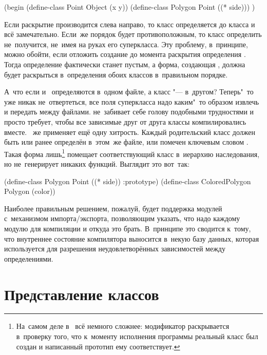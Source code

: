 \begin{code:lisp}
(begin (define-class Point Object (x y))
       (define-class Polygon Point ((* side))) )
\end{code:lisp}

Если раскрытие производится слева направо, то класс  определяется до
класса  и всё замечательно. Если~же порядок будет противоположным,
то класс  определить не~получится, не~имея на руках его суперкласса.
Эту проблему, в~принципе, можно обойти, если отложить создание  до
момента раскрытия определения . Тогда определение 
фактически станет пустым, а форма, создающая , должна будет раскрыться
в~определения обоих классов в~правильном порядке.

А~что если  и~ определяются в~одном файле, а класс
 "--- в~другом? Теперь"~то уже никак не~отвертеться, все
поля суперкласса надо каким"~то образом извлечь и передать между файлами.
{\Meroonet} не~забивает себе голову подобными трудностями и просто требует,
чтобы все зависимые друг от друга классы компилировались вместе. {\Meroon}~же
применяет ещё одну хитрость. Каждый родительский класс должен быть или ранее
определён в~этом~же файле, или помечен ключевым словом . Такая
форма лишь\footnote{На~самом деле в~{\Meroon} всё немного сложнее: модификатор
 раскрывается в~проверку того, что к~моменту исполнения программы
реальный класс был создан и написанный прототип ему соответствует.} помещает
соответствующий класс в~иерархию наследования, но не~генерирует никаких функций.
Выглядит это вот~так:

\begin{code:lisp}
(define-class Polygon Point ((* side)) :prototype)
(define-class ColoredPolygon Polygon (color))
\end{code:lisp}

Наиболее правильным решением, пожалуй, будет поддержка модулей с~механизмом
импорта/экспорта, позволяющим указать, что надо каждому модулю для компиляции и
откуда это брать. В~принципе это сводится к~тому, что внутреннее состояние
компилятора выносится в~некую базу данных, которая используется для разрешения
неудовлетворённых зависимостей между определениями.


\section{Представление классов}\label{objects/sect:repr-class}

